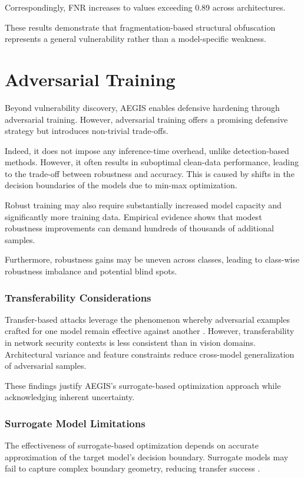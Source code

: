Correspondingly, FNR increases to values exceeding 0.89 across architectures.

These results demonstrate that fragmentation-based structural obfuscation represents a general vulnerability rather than a model-specific weakness.

\section{Adversarial Training}
Beyond vulnerability discovery, AEGIS enables defensive hardening through adversarial training.
However, adversarial training offers a promising defensive strategy but introduces non-trivial trade-offs.

Indeed, it does not impose any inference-time overhead, unlike detection-based methods. However, it often results in suboptimal clean-data performance, leading to the trade-off between robustness and accuracy. This is caused by shifts in the decision boundaries of the models due to min-max optimization.

Robust training may also require substantially increased model capacity and significantly more training data. Empirical evidence shows that modest robustness improvements can demand hundreds of thousands of additional samples.

Furthermore, robustness gains may be uneven across classes, leading to class-wise robustness imbalance and potential blind spots.

\subsubsection*{Transferability Considerations}

Transfer-based attacks leverage the phenomenon whereby adversarial examples crafted for one model remain effective against another \cite{he2023adversarial}. However, transferability in network security contexts is less consistent than in vision domains. Architectural variance and feature constraints reduce cross-model generalization of adversarial samples.

These findings justify AEGIS’s surrogate-based optimization approach while acknowledging inherent uncertainty.

\subsubsection*{Surrogate Model Limitations}

The effectiveness of surrogate-based optimization depends on accurate approximation of the target model’s decision boundary. Surrogate models may fail to capture complex boundary geometry, reducing transfer success \cite{ennaji2025adversarial}.

